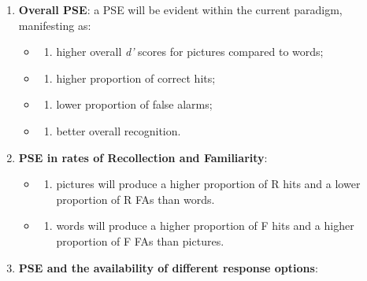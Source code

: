 \documentclass[
  11pt,
]{article}
\providecommand{\tightlist}{%
  \setlength{\itemsep}{0pt}\setlength{\parskip}{0pt}}
\begin{document}
\begin{enumerate}
\def\labelenumi{\arabic{enumi}.}
\tightlist
\item
  \textbf{Overall PSE}: a PSE will be evident within the current
  paradigm, manifesting as:

  \begin{itemize}
  \item
    \begin{enumerate}
    \def\labelenumii{\roman{enumii})}
    \tightlist
    \item
      higher overall \emph{d'} scores for pictures compared to words;
    \end{enumerate}
  \item
    \begin{enumerate}
    \def\labelenumii{\roman{enumii})}
    \setcounter{enumii}{1}
    \tightlist
    \item
      higher proportion of correct hits;
    \end{enumerate}
  \item
    \begin{enumerate}
    \def\labelenumii{\roman{enumii})}
    \setcounter{enumii}{1}
    \tightlist
    \item
      lower proportion of false alarms;
    \end{enumerate}
  \item
    \begin{enumerate}
    \def\labelenumii{\roman{enumii})}
    \setcounter{enumii}{3}
    \tightlist
    \item
      better overall recognition.
    \end{enumerate}
  \end{itemize}
\item
  \textbf{PSE in rates of Recollection and Familiarity}:

  \begin{itemize}
  \item
    \begin{enumerate}
    \def\labelenumii{\roman{enumii})}
    \tightlist
    \item
      pictures will produce a higher proportion of R hits and a lower
      proportion of R FAs than words.
    \end{enumerate}
  \item
    \begin{enumerate}
    \def\labelenumii{\roman{enumii})}
    \setcounter{enumii}{1}
    \tightlist
    \item
      words will produce a higher proportion of F hits and a higher
      proportion of F FAs than pictures.
    \end{enumerate}
  \end{itemize}
\item
  \textbf{PSE and the availability of different response options}:


\end{enumerate}
\end{document}
